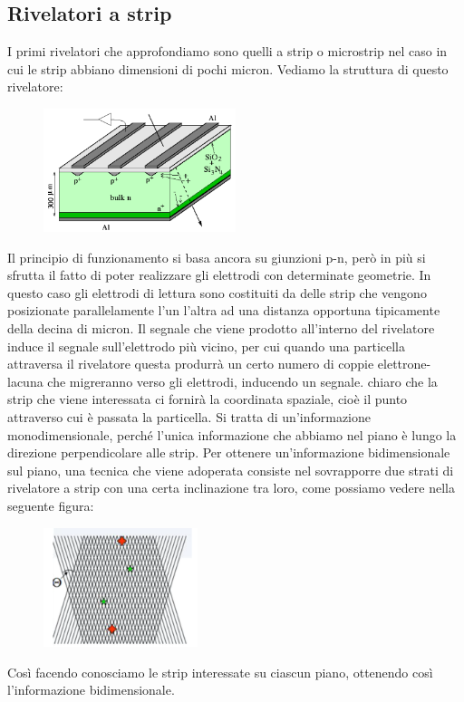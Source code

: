 \subsection{Rivelatori a strip}
I primi rivelatori che approfondiamo sono quelli a strip o microstrip nel caso in cui le strip abbiano dimensioni di pochi micron. Vediamo la struttura di questo rivelatore:
\begin{figure}[H]
   \centering
   \includegraphics[width=0.5\textwidth]{immagini/rivelatori_a_strip.png}
\end{figure}
Il principio di funzionamento si basa ancora su giunzioni p-n, però in più si sfrutta il fatto di poter realizzare gli elettrodi con determinate geometrie. In questo caso gli elettrodi di lettura sono costituiti da delle strip che vengono posizionate parallelamente l'un l'altra ad una distanza opportuna tipicamente della decina di micron. Il segnale che viene prodotto all'interno del rivelatore induce il segnale sull'elettrodo più vicino, per cui quando una particella attraversa il rivelatore questa produrrà un certo numero di coppie elettrone-lacuna che migreranno verso gli elettrodi, inducendo un segnale. \E chiaro che la strip che viene interessata ci fornirà la coordinata spaziale, cioè il punto attraverso cui è passata la particella. Si tratta di un'informazione monodimensionale, perché l'unica informazione che abbiamo nel piano è lungo la direzione perpendicolare alle strip. Per ottenere un'informazione bidimensionale sul piano, una tecnica che viene adoperata consiste nel sovrapporre due strati di rivelatore a strip con una certa inclinazione tra loro, come possiamo vedere nella seguente figura:
\begin{figure}[H]
   \centering
   \includegraphics[width=0.4\textwidth]{immagini/angolo_rivelatore_a_strip.png}
\end{figure}
Così facendo conosciamo le strip interessate su ciascun piano, ottenendo così l'informazione bidimensionale.

